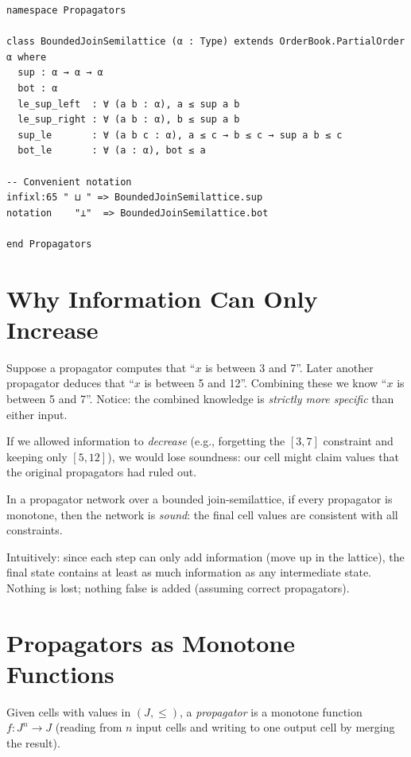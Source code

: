 \documentclass[12pt, a4paper, openright]{book}
\theoremstyle{thmstyle}
\theoremstyle{defstyle}
\newenvironment{defbox}[1][]{%
  \begin{tcolorbox}[defbox, title={Definition\ifx\\#1\\\else\ --- #1\fi}]%
}{\end{tcolorbox}}
\newenvironment{thmbox}[1][]{%
  \begin{tcolorbox}[thmbox, title={\ifx\\#1\\Theorem\else#1\fi}]%
}{\end{tcolorbox}}
\begin{document}
\begin{verbatim}
namespace Propagators

class BoundedJoinSemilattice (α : Type) extends OrderBook.PartialOrder α where
  sup : α → α → α
  bot : α
  le_sup_left  : ∀ (a b : α), a ≤ sup a b
  le_sup_right : ∀ (a b : α), b ≤ sup a b
  sup_le       : ∀ (a b c : α), a ≤ c → b ≤ c → sup a b ≤ c
  bot_le       : ∀ (a : α), bot ≤ a

-- Convenient notation
infixl:65 " ⊔ " => BoundedJoinSemilattice.sup
notation    "⊥"  => BoundedJoinSemilattice.bot

end Propagators
\end{verbatim}

\section{Why Information Can Only Increase}

Suppose a propagator computes that ``$x$ is between 3 and 7''. Later another
propagator deduces that ``$x$ is between 5 and 12''. Combining these we know
``$x$ is between 5 and 7''. Notice: the combined knowledge is \emph{strictly
more specific} than either input.

If we allowed information to \emph{decrease} (e.g., forgetting the $[3,7]$
constraint and keeping only $[5,12]$), we would lose soundness: our cell might
claim values that the original propagators had ruled out.

\begin{thmbox}[Monotonicity Ensures Soundness]
  In a propagator network over a bounded join-semilattice, if every propagator
  is monotone, then the network is \emph{sound}: the final cell values are
  consistent with all constraints.
\end{thmbox}

Intuitively: since each step can only add information (move up in the lattice),
the final state contains at least as much information as any intermediate state.
Nothing is lost; nothing false is added (assuming correct propagators).

\section{Propagators as Monotone Functions}

\begin{defbox}[Propagator]
  Given cells with values in $(J, \leq)$, a \emph{propagator} is a monotone
  function $f : J^n \to J$ (reading from $n$ input cells and writing to one
  output cell by merging the result).
\end{defbox}
\end{document}

